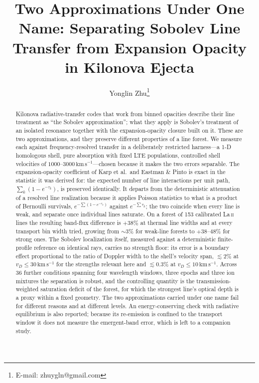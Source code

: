 \documentclass[fleqn,usenatbib]{mnras}
\title[Separating Sobolev transfer from expansion opacity]{Two Approximations
Under One Name: Separating Sobolev Line Transfer from Expansion Opacity in
Kilonova Ejecta}
\author[Y. Zhu]{Yonglin Zhu\thanks{E-mail: zhuygln@gmail.com}}
\newcommand{\kms}{\,\mathrm{km\,s^{-1}}}
\begin{document}
\label{firstpage}
\maketitle

\begin{abstract}
Kilonova radiative-transfer codes that work from binned opacities describe
their line treatment as ``the Sobolev approximation''; what they apply is
Sobolev's treatment of an isolated resonance together with the expansion-opacity
closure built on it. These are two approximations, and they preserve different
properties of a line forest. We measure each against frequency-resolved
transfer in a deliberately restricted harness---a 1-D homologous shell, pure
absorption with fixed LTE populations, controlled shell velocities of
$1000$--$3000\kms$---chosen because it makes the two errors separable. The
expansion-opacity coefficient of Karp et al.\ and Eastman \& Pinto is exact in
the statistic it was derived for: the expected number of line interactions per
unit path, $\sum_k(1-e^{-\tau_k})$, is preserved identically. It departs from
the deterministic attenuation of a resolved line realization because it
applies Poisson statistics to what is a product of Bernoulli survivals,
$e^{-\sum(1-e^{-\tau_k})}$ against $e^{-\sum\tau_k}$; the two coincide when every
line is weak, and separate once individual lines saturate. On a forest of 153
calibrated La\,\textsc{ii} lines the resulting band-flux difference is $+38\%$
at thermal line widths and at every transport bin width tried, growing from
$\sim3\%$ for weak-line forests to $+38$--$48\%$ for strong ones. The Sobolev
localization itself, measured against a deterministic finite-profile reference
on identical rays, carries no strength floor: its error is a boundary effect
proportional to the ratio of Doppler width to the shell's velocity span,
$\lesssim2\%$ at $v_D\le30\kms$ for the strengths relevant here and
$\lesssim0.3\%$ at $v_D\le10\kms$. Across 36 further conditions spanning four
wavelength windows, three epochs and three ion mixtures the separation is
robust, and the controlling quantity is the transmission-weighted saturation
deficit of the forest, for which the strongest line's optical depth is a
proxy within a fixed geometry. The two approximations carried under one name
fail for different reasons and at different levels. An energy-conserving
check with radiative equilibrium is also reported; because its re-emission is
confined to the transport window it does not measure the emergent-band error,
which is left to a companion study.
\end{abstract}
\end{document}

